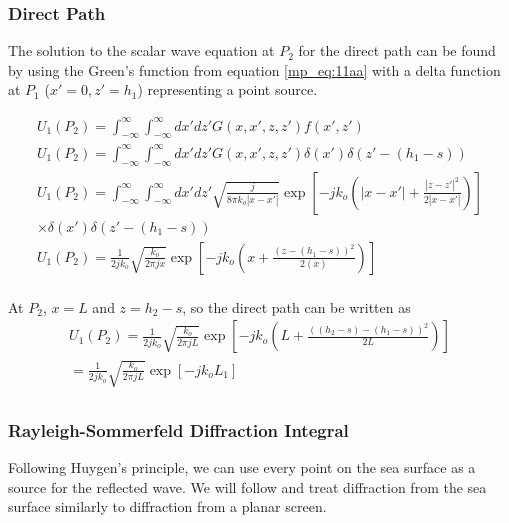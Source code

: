 \subsubsection{Direct Path}
The solution to the scalar wave equation at $P_2$ for the direct path can be found by using the Green's function from equation \ref{mp_eq:11aa} with a delta function at $P_1$ ($x' = 0, z' = h_1$) representing a point source.

\begin{equation}
\begin{gathered}
U_1(P_2) = \int_{-\infty}^{\infty} \int_{-\infty}^{\infty}dx' dz' G\left(x,x',z,z' \right) f(x',z') \\
U_1(P_2) = \int_{-\infty}^{\infty} \int_{-\infty}^{\infty}dx' dz' G\left(x,x',z,z' \right)\delta(x') \delta(z'- (h_1-s)) \\
U_1(P_2) = \int_{-\infty}^{\infty} \int_{-\infty}^{\infty}dx' dz' \sqrt{\frac{j}{8\pi k_o|x-x'|}}\exp\left[-jk_o\left(|x -x'| + \frac{|z-z'|^2}{2|x-x'|}\right) \right] \\
\times \delta(x') \delta(z'- (h_1-s)) \\
U_1(P_2) = \frac{1}{2jk_o}\sqrt{\frac{k_o}{2\pi jx}}\exp\left[-jk_o\left(x + \frac{(z-(h_1-s))^2}{2(x)}\right) \right]\\
\end{gathered}
\label{mp_eq:11ab}
\end{equation}
\renewcommand{\baselinestretch}{2} \small\normalsize

At $P_2$, $x = L$ and $z = h_2-s$, so the direct path can be written as
\begin{equation}
\begin{gathered}
U_1(P_2) = \frac{1}{2jk_o}\sqrt{\frac{k_o}{2\pi jL}}\exp\left[-jk_o\left(L + \frac{((h_2-s)-(h_1-s))^2}{2L}\right) \right]\\
=\frac{1}{2jk_o} \sqrt{\frac{k_o}{2\pi jL}}\exp\left[-jk_oL_1 \right]\\
\end{gathered}
\label{mp_eq:11ac}
\end{equation}
\renewcommand{\baselinestretch}{2} \small\normalsize

\subsubsection{Rayleigh-Sommerfeld Diffraction Integral}
Following Huygen's principle, we can use every point on the sea surface as a source for the reflected wave. We will follow \cite{goodman_fourier} and treat diffraction from the sea surface similarly to diffraction from a planar screen. 

